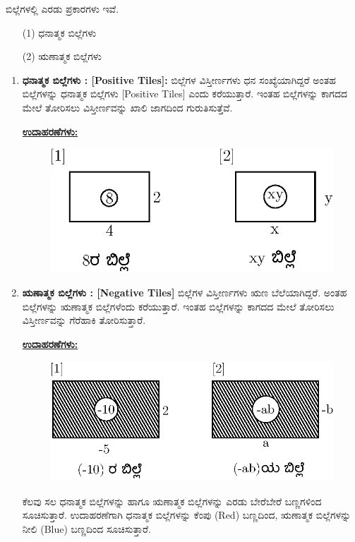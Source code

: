 ಬಿಲ್ಲೆಗಳಲ್ಲಿ ಎರಡು ಪ್ರಕಾರಗಳು ಇವೆ. 
\begin{itemize}
\item[(1)] ಧನಾತ್ಮಕ ಬಿಲ್ಲೆಗಳು 
\item[(2)] ಋಣಾತ್ಮಕ ಬಿಲ್ಲೆಗಳು 
\end{itemize}
\begin{enumerate}
\item \textbf{ಧನಾತ್ಮಕ ಬಿಲ್ಲೆಗಳು : [Positive Tiles]:} ಬಿಲ್ಲೆಗಳ ವಿಸ್ತೀರ್ಣಗಳು ಧನ ಸಂಖ್ಯೆಯಾಗಿದ್ದರೆ ಅಂತಹ ಬಿಲ್ಲೆಗಳನ್ನು ಧನಾತ್ಮಕ ಬಿಲ್ಲೆಗಳು [Positive Tiles] ಎಂದು ಕರೆಯುತ್ತಾರೆ. ಇಂತಹ ಬಿಲ್ಲೆಗಳನ್ನು ಕಾಗದದ ಮೇಲೆ ತೋರಿಸಲು ವಿಸ್ತೀರ್ಣವನ್ನು ಖಾಲಿ ಜಾಗದಿಂದ ಗುರುತಿಸುತ್ತೆವೆ. 
 

\noindent
{\textbf{\underline{ಉದಾಹರಣೆಗಳು: }}}
\begin{figure}[H]
\centering
\includegraphics[scale=0.8]{src/figure/chap3/fig3-2.eps}
\end{figure}

\item \textbf{ಋಣಾತ್ಮಕ ಬಿಲ್ಲೆಗಳು : [Negative Tiles]} ಬಿಲ್ಲೆಗಳ ವಿಸ್ತೀರ್ಣಗಳು ಋಣ ಬೆಲೆಯಾಗಿದ್ದರೆ. ಅಂತಹ ಬಿಲ್ಲೆಗಳನ್ನು ಋಣಾತ್ಮಕ ಬಿಲ್ಲೆಗಳೆಂದು ಕರೆಯುತ್ತಾರೆ. ಇಂತಹ ಬಿಲ್ಲೆಗಳನ್ನು ಕಾಗದದ ಮೇಲೆ ತೋರಿಸಲು ವಿಸ್ತೀರ್ಣವನ್ನು ಗೆರೆಹಾಕಿ ತೋರಿಸುತ್ತಾರೆ.

\noindent
{\textbf{\underline{ಉದಾಹರಣೆಗಳು: }}}
\begin{figure}[H]
\centering
\includegraphics[scale=0.8]{src/figure/chap3/fig3-3.eps}
\end{figure}

ಕೆಲವು ಸಲ ಧನಾತ್ಮಕ ಬಿಲ್ಲೆಗಳನ್ನು ಹಾಗೂ ಋಣಾತ್ಮಕ ಬಿಲ್ಲೆಗಳನ್ನು ಎರಡು ಬೇರೆಬೇರೆ ಬಣ್ಣಗಳಿಂದ ಸೂಚಿಸುತ್ತಾರೆ. ಉದಾಹರಣೆಗಾಗಿ ಧನಾತ್ಮಕ ಬಿಲ್ಲೆಗಳನ್ನು ಕೆಂಪು (Red) ಬಣ್ಣದಿಂದ, ಋಣಾತ್ಮಕ ಬಿಲ್ಲೆಗಳನ್ನು ನೀಲಿ (Blue) ಬಣ್ಣದಿಂದ ಸೂಚಿಸುತ್ತಾರೆ.
\end{enumerate}

